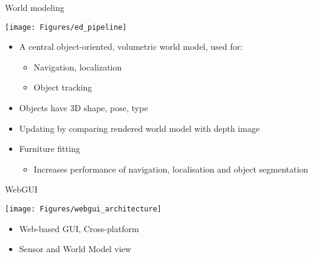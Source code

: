 \documentclass[12pt,a4paper]{article}
\newcommand{\emptylogo}{\texttt{[image: Figures/Empty]}}
\begin{document}
\begin{slidetop}
\begin{multicols}{2}
\begin{bclogo}[couleur = white, arrondi = 0.25, couleurBord = tuedarkblue , barre = none, logo=\emptylogo]{\textcolor{tuedarkblue}{World modeling}}
\medskip %
\begin{minipage}[T]{\textwidth}
    \begin{center}
        \texttt{[image: Figures/ed\_pipeline]}
    \end{center}
\end{minipage}
\begin{itemize}[itemsep = 0pt, parsep = 0pt, leftmargin=15pt]
	\item A central object-oriented, volumetric world model, used for:	
	\begin{itemize}[itemsep = 0pt, parsep = 0pt, leftmargin=15pt]
		\item Navigation, localization
		\item Object tracking
	\end{itemize}
	\item Objects have 3D shape, pose, type
	\item Updating by comparing rendered world model with depth image
    \item Furniture fitting
    \begin{itemize}[itemsep = 0pt, parsep = 0pt, leftmargin=15pt]
		\item Increases performance of navigation, localisation and object segmentation
	\end{itemize}


\end{itemize}
\end{bclogo}

\vspace{-0.83cm} %

\begin{bclogo}[couleur = white, arrondi = 0.25, couleurBord = tuedarkblue , barre = none, logo=\emptylogo]{\textcolor{tuedarkblue}{WebGUI}}
\medskip %
\begin{minipage}[T]{\textwidth}
    \begin{center}
        \texttt{[image: Figures/webgui\_architecture]}
    \end{center}
\end{minipage}
\begin{itemize}[itemsep = 0pt, parsep = 0pt, leftmargin=15pt]
	\item Web-based GUI, Cross-platform
	\item Sensor and World Model view
\end{itemize}
\end{bclogo}


\end{multicols}
\end{slidetop}
\end{document}
